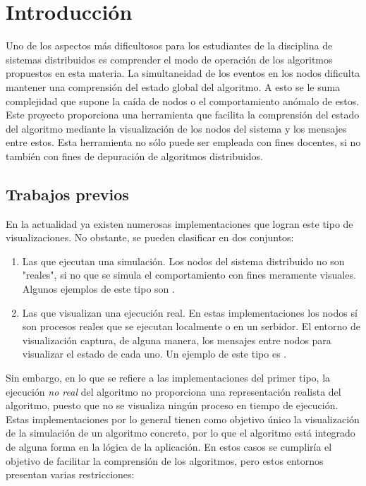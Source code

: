 \chapter{Introducción}
\label{ch:intro}

Uno de los aspectos más dificultosos para los estudiantes de la disciplina de sistemas distribuidos es comprender el modo de operación de los algoritmos propuestos en esta materia. La simultaneidad de los eventos en los nodos dificulta mantener una comprensión del estado global del algoritmo. A esto se le suma complejidad que supone la caída de nodos o el comportamiento anómalo de estos. Este proyecto proporciona una herramienta que facilita la comprensión del estado del algoritmo mediante la visualización de los nodos del sistema y los mensajes entre estos. Esta herramienta no sólo puede ser empleada con fines docentes, si no también con fines de depuración de algoritmos distribuidos.

\section{Trabajos previos}

En la actualidad ya existen numerosas implementaciones que logran este tipo de visualizaciones. No obstante, se pueden clasificar en dos conjuntos:

\begin{enumerate}
\item Las que ejecutan una simulación. Los nodos del sistema distribuido no son "reales", si no que se simula el comportamiento con fines meramente visuales. Algunos ejemplos de este tipo son \cite{raft1}\cite{raft2}\cite{raft3}.
\item Las que visualizan una ejecución real. En estas implementaciones los nodos sí son procesos reales que se ejecutan localmente o en un serbidor. El entorno de visualización captura, de alguna manera, los mensajes entre nodos para visualizar el estado de cada uno. Un ejemplo de este tipo es \cite{MOSES200497}.
\end{enumerate}

Sin embargo, en lo que se refiere a las implementaciones del primer tipo, la ejecución \textit{no real} del algoritmo no proporciona una representación realista del algoritmo, puesto que no se visualiza ningún proceso en tiempo de ejecución. Estas implementaciones por lo general tienen como objetivo único la visualización de la simulación de un algoritmo concreto, por lo que el algoritmo está integrado de alguna forma en la lógica de la aplicación. En estos casos se cumpliría el objetivo de facilitar la comprensión de los algoritmos, pero estos entornos presentan varias restricciones:

